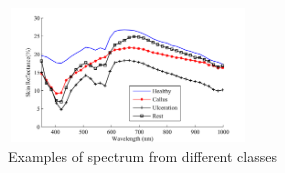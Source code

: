 \documentclass[journal]{IEEEtran}
\begin{document}
%
%
\begin{figure}[!t]
        \centering
        \includegraphics[width=2.5in, height=1.4in]{examples.png}
        \caption{Examples of spectrum from different classes}
        \label{fig:example}
\end{figure}



%
%
\end{document}
